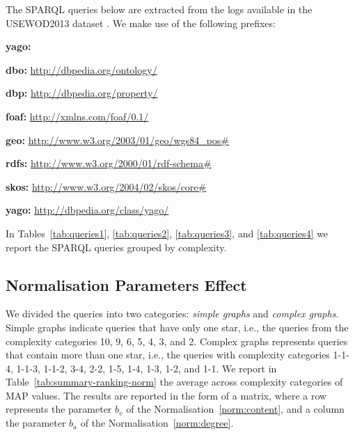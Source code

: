 The SPARQL queries below are extracted from the logs available in the USEWOD2013 dataset \cite{usewod:2013}. We make use of the following prefixes:
\begin{labeling}{\textbf{yago:}}
	\item[\textbf{dbo:}] \url{http://dbpedia.org/ontology/}
	\item[\textbf{dbp:}] \url{http://dbpedia.org/property/}
	\item[\textbf{foaf:}] \url{http://xmlns.com/foaf/0.1/}
	\item[\textbf{geo:}] \url{http://www.w3.org/2003/01/geo/wgs84\_pos#}
	\item[\textbf{rdfs:}] \url{http://www.w3.org/2000/01/rdf-schema#}
	\item[\textbf{skos:}] \url{http://www.w3.org/2004/02/skos/core#}
	\item[\textbf{yago:}] \url{http://dbpedia.org/class/yago/}
\end{labeling}

In Tables~\ref{tab:queries1}, \ref{tab:queries2}, \ref{tab:queries3}, and \ref{tab:queries4} we report the SPARQL queries grouped by complexity.









\subsection{Normalisation Parameters Effect}

We divided the queries into two categories: \emph{simple graphs} and \emph{complex graphs}. Simple graphs indicate queries that have only one star, i.e., the queries from the complexity categories 10, 9, 6, 5, 4, 3, and 2. Complex graphs represents queries that contain more than one star, i.e., the queries with complexity categories 1-1-4, 1-1-3, 1-1-2, 3-4, 2-2, 1-5, 1-4, 1-3, 1-2, and 1-1. We report in Table~\ref{tab:summary-ranking-norm} the average across complexity categories of MAP values. The results are reported in the form of a matrix, where a row represents the parameter $b_v$ of the Normalisation~\ref{norm:content}, and a column the parameter $b_a$ of the Normalisation~\ref{norm:degree}.


